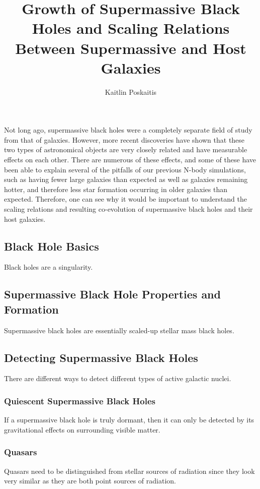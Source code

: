 \documentclass[12pt]{article}
\title{Growth of Supermassive Black Holes and Scaling Relations
              Between Supermassive and Host Galaxies}
\date{}
\author{Kaitlin Poskaitis}
\begin{document}
\maketitle

Not long ago, supermassive black holes were a completely separate field of study
from that of galaxies.  However, more recent discoveries have shown that these
two types of astronomical objects are very closely related and have measurable
effects on each other.  There are numerous of these effects, and some of these
have been able to explain several of the pitfalls of our previous N-body
simulations, such as having fewer large galaxies than expected as well as
galaxies remaining hotter, and therefore less star formation occurring in older
galaxies than expected.  Therefore, one can see why it would be important to
understand the scaling relations and resulting co-evolution of supermassive
black holes and their host galaxies.

\subsection*{Black Hole Basics}
Black holes are a singularity.

\subsection*{Supermassive Black Hole Properties and Formation}
Supermassive black holes are essentially scaled-up stellar mass black holes.

\subsection*{Detecting Supermassive Black Holes}
There are different ways to detect different types of active galactic nuclei.

    \subsubsection*{Quiescent Supermassive Black Holes}
    If a supermassive black hole is truly dormant, then it can only be detected
    by its gravitational effects on surrounding visible matter.

    \subsubsection*{Quasars}
    Quasars need to be distinguished from stellar sources of radiation since
    they look very similar as they are both point sources of radiation.
\end{document}
